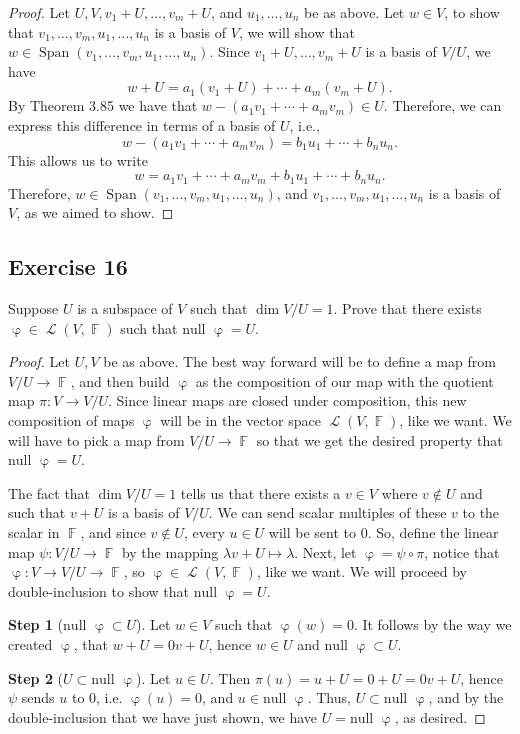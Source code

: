\documentclass[letterpaper, 12pt]{amsart}
\DeclareMathOperator{\F}{\mathbb{F}}				%
\DeclareMathOperator{\Ell}{\mathscr{L}}				%
\DeclareMathOperator{\ph}{\varphi}					%
\renewcommand{\null}{\text{null }}					%
\DeclareMathOperator{\Span}{Span}					%
\theoremstyle{definition}  							%
\begin{document}
		\begin{proof}
		Let $U, V, v_{1} + U, \dots, v_{m} + U$, and $u_{1}, \dots, u_{n}$ be as above.
		Let $w \in V$, to show that $v_{1}, \dots, v_{m},u_{1}, \dots, u_{n}$ is a basis of $V$, we will show that $w \in \Span(v_{1}, \dots, v_{m},u_{1}, \dots, u_{n})$.
		Since $v_{1} + U, \dots, v_{m} + U$ is a basis of $V/U$, we have $$w + U = a_{1}(v_{1} + U) + \cdots + a_{m}(v_{m}+U).$$ By Theorem 3.85 we have that $w - (a_{1}v_{1} + \cdots + a_{m}v_{m}) \in U$.
		Therefore, we can express this difference in terms of a basis of $U$, i.e., $$w - (a_{1}v_{1} + \cdots + a_{m}v_{m}) = b_{1}u_{1} + \cdots + b_{n}u_{n}.$$ 
		This allows us to write $$w = a_{1}v_{1} + \cdots + a_{m}v_{m} + b_{1}u_{1} + \cdots + b_{n}u_{n}.$$ 
		Therefore, $w \in \Span(v_{1}, \dots, v_{m},u_{1}, \dots,u_{n})$, and $v_{1}, \dots, v_{m},u_{1}, \dots, u_{n}$ is a basis of $V$, as we aimed to show.
		\end{proof}

		\subsection*{Exercise 16}
		Suppose $U$ is a subspace of $V$ such that $\dim V/U = 1$. 
		Prove that there exists $\ph \in \Ell(V, \F)$ such that $\null \ph = U$.

		\begin{proof}
		Let $U,V$ be as above.
		The best way forward will be to define a map from $V/U \to \F$, and then build $\ph$ as the composition of our map with the quotient map $\pi : V \to V/U$.
		Since linear maps are closed under composition, this new composition of maps $\ph$ will be in the vector space $\Ell(V, \F)$, like we want.
		We will have to pick a map from $V/U \to \F$ so that we get the desired property that $\null \ph = U$.

		The fact that $\dim V/U = 1$ tells us that there exists a $v \in V$ where $v \notin U$ and such that $v + U$ is a basis of $V/U$.
		We can send scalar multiples of these $v$ to the scalar in $\F$, and since $v \notin U$, every $u \in U$ will be sent to $0$.
		So, define the linear map $\psi : V/U \to \F$ by the mapping $\lambda v + U \mapsto \lambda$.
		Next, let $\ph = \psi \circ \pi$, notice that $\ph : V \to V/U \to \F$, so $\ph \in \Ell(V,\F)$, like we want.
		We will proceed by double-inclusion to show that $\null \ph = U$.

		\textbf{Step 1} ($\null \ph \subset U$).
		Let $w \in V$ such that $\ph(w) = 0$.
		It follows by the way we created $\ph$, that $w + U = 0v + U$, hence $w \in U$ and $\null \ph \subset U$.

		\textbf{Step 2} ($U \subset \null \ph$).
		Let $u \in U$.
		Then $\pi(u) = u + U = 0 + U = 0v + U$, hence $\psi$ sends $u$ to $0$, i.e. $\ph(u) = 0$, and $u \in \null \ph$.
		Thus, $U \subset \null \ph$, and by the double-inclusion that we have just shown, we have $U = \null \ph$, as desired.
		\end{proof}
\end{document}
